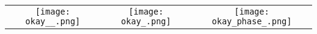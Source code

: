 \begin{tabular}{c @{\hskip 0pt} c @{\hskip 0pt} c }
    \texttt{[image: okay\_\_.png]}&
    \texttt{[image: okay\_.png]}&
    \texttt{[image: okay\_phase\_.png]}
\end{tabular}
